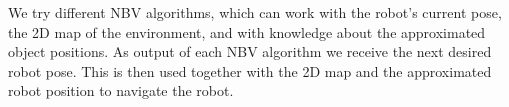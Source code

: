We try different NBV algorithms, which can work with the robot's current pose, the 2D map of the environment, and with knowledge about the approximated object positions.
As output of each NBV algorithm we receive the next desired robot pose.
This is then used together with the 2D map and the approximated robot position to navigate the robot.


